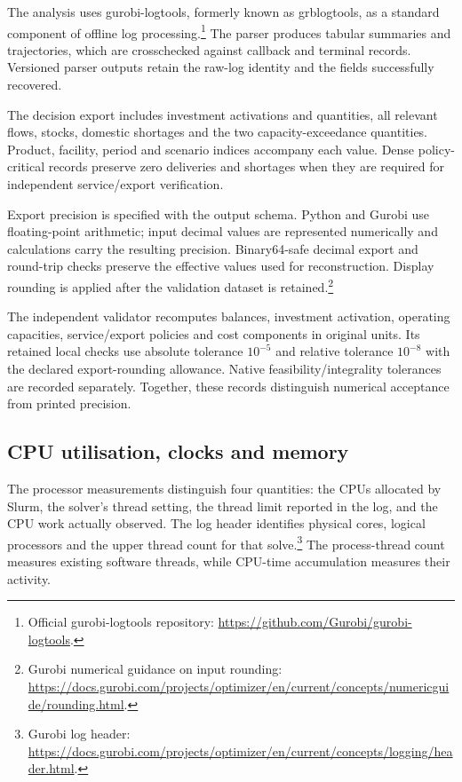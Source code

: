 \documentclass[11pt,a4paper]{article}
\newcommand{\technical}[2]{\footnote{#1: \url{#2}.}}
\begin{document}
The analysis uses gurobi-logtools, formerly known as grblogtools, as a standard component of offline log processing.\technical{Official gurobi-logtools repository}{https://github.com/Gurobi/gurobi-logtools} The parser produces tabular summaries and trajectories, which are crosschecked against callback and terminal records. Versioned parser outputs retain the raw-log identity and the fields successfully recovered.

The decision export includes investment activations and quantities, all relevant flows, stocks, domestic shortages and the two capacity-exceedance quantities. Product, facility, period and scenario indices accompany each value. Dense policy-critical records preserve zero deliveries and shortages when they are required for independent service/export verification.

Export precision is specified with the output schema. Python and Gurobi use floating-point arithmetic; input decimal values are represented numerically and calculations carry the resulting precision. Binary64-safe decimal export and round-trip checks preserve the effective values used for reconstruction. Display rounding is applied after the validation dataset is retained.\technical{Gurobi numerical guidance on input rounding}{https://docs.gurobi.com/projects/optimizer/en/current/concepts/numericguide/rounding.html}

The independent validator recomputes balances, investment activation, operating capacities, service/export policies and cost components in original units. Its retained local checks use absolute tolerance $10^{-5}$ and relative tolerance $10^{-8}$ with the declared export-rounding allowance. Native feasibility/integrality tolerances are recorded separately. Together, these records distinguish numerical acceptance from printed precision.

\subsection{CPU utilisation, clocks and memory}

The processor measurements distinguish four quantities: the CPUs allocated by Slurm, the solver's thread setting, the thread limit reported in the log, and the CPU work actually observed. The log header identifies physical cores, logical processors and the upper thread count for that solve.\technical{Gurobi log header}{https://docs.gurobi.com/projects/optimizer/en/current/concepts/logging/header.html} The process-thread count measures existing software threads, while CPU-time accumulation measures their activity.
\end{document}
